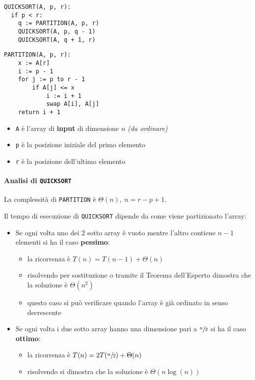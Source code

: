 \documentclass[italian, 10pt]{article}
\begin{document}
  \begin{minipage}[t]{0.495\textwidth}
    \begin{lstlisting}[style=pseudocode, caption={Pseudocodice di \texttt{QUICKSORT}}, label={sec:algoritmo-quicksort}]
QUICKSORT(A, p, r):
  if p < r:
    q := PARTITION(A, p, r)
    QUICKSORT(A, p, q - 1)
    QUICKSORT(A, q + 1, r)
        \end{lstlisting}
  \end{minipage}
  \begin{minipage}[t]{0.495\textwidth}
    \begin{lstlisting}[style=pseudocode, caption={Pseudocodice di \texttt{PARTITION}}, label={sec:algoritmo-partition}]
PARTITION(A, p, r):
    x := A[r]
    i := p - 1
    for j := p to r - 1
        if A[j] <= x
            i := i + 1
            swap A[i], A[j]
    return i + 1
  \end{lstlisting}
  \end{minipage}

\begin{itemize}
  \item \texttt{A} è l'array di \textbf{input} di dimensione \(n\) \textit{(da ordinare)}
  \item \texttt{p} è la posizione iniziale del primo elemento
  \item \texttt{r} è la posizione dell'ultimo elemento
\end{itemize}

\paragraph{Analisi di \texttt{QUICKSORT}}

La complessità di \texttt{PARTITION} è \(\Theta(n),\ n = r - p + 1\).

\bigskip
Il tempo di esecuzione di \texttt{QUICKSORT} dipende da come viene partizionato l'array:

\begin{itemize}
  \item Se ogni volta uno dei \(2\) sotto array è vuoto mentre l'altro contiene \(n-1\) elementi si ha il caso \textbf{pessimo}:
        \begin{itemize}
          \item la ricorrenza è \(T(n) = T(n - 1) + \Theta(n)\)
          \item risolvendo per sostituzione o tramite il Teorema dell'Esperto dimostra che la soluzione è \(\Theta(n^2)\)
          \item questo caso si può verificare quando l'array è già ordinato in senso decrescente
        \end{itemize}
  \item Se ogni volta i due sotto array hanno una dimensione pari a \(\sfrac{n}{2}\) si ha il caso \textbf{ottimo}:
        \begin{itemize}
          \item la ricorrenza è \(T(n) = 2T(\sfrac{n}{2}) + \Theta(n)\)
          \item risolvendo si dimostra che la soluzione è \(\Theta(n \log{(n)})\)
        \end{itemize}
\end{itemize}
\end{document}
